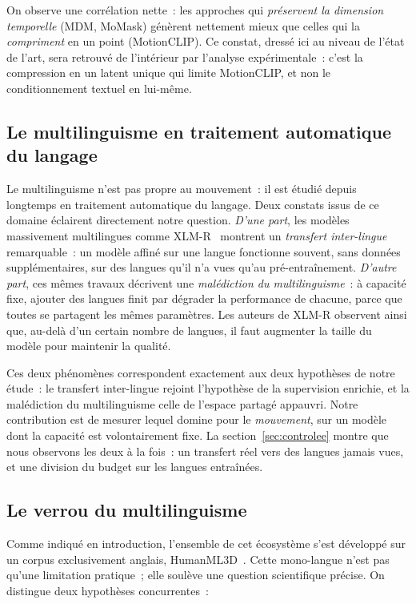 \documentclass[12pt,a4paper,oneside]{report}
\theoremstyle{definition}
\theoremstyle{plain}
\begin{document}
On observe une corrélation nette~: les approches qui \emph{préservent la dimension
temporelle} (MDM, MoMask) génèrent nettement mieux que celles qui la
\emph{compriment} en un point (MotionCLIP). Ce constat, dressé ici au niveau de
l'état de l'art, sera retrouvé de l'intérieur par l'analyse expérimentale~: c'est la
compression en un latent unique qui limite MotionCLIP, et non le conditionnement
textuel en lui-même.

\subsection{Le multilinguisme en traitement automatique du langage}
\label{sub:nlp-multi}

Le multilinguisme n'est pas propre au mouvement~: il est étudié depuis longtemps en
traitement automatique du langage. Deux constats issus de ce domaine éclairent
directement notre question. \emph{D'une part}, les modèles massivement multilingues
comme XLM-R~\cite{conneau2020xlmr} montrent un \emph{transfert inter-lingue}
remarquable~: un modèle affiné sur une langue fonctionne souvent, sans données
supplémentaires, sur des langues qu'il n'a vues qu'au pré-entraînement. \emph{D'autre
part}, ces mêmes travaux décrivent une \emph{malédiction du multilinguisme}~: à
capacité fixe, ajouter des langues finit par dégrader la performance de chacune,
parce que toutes se partagent les mêmes paramètres. Les auteurs de XLM-R observent
ainsi que, au-delà d'un certain nombre de langues, il faut augmenter la taille du
modèle pour maintenir la qualité.

Ces deux phénomènes correspondent exactement aux deux hypothèses de notre étude~:
le transfert inter-lingue rejoint l'hypothèse de la supervision enrichie, et la
malédiction du multilinguisme celle de l'espace partagé appauvri. Notre
contribution est de mesurer lequel domine pour le \emph{mouvement}, sur un modèle
dont la capacité est volontairement fixe. La section~\ref{sec:controlee} montre que
nous observons les deux à la fois~: un transfert réel vers des langues jamais vues,
et une division du budget sur les langues entraînées.

\subsection{Le verrou du multilinguisme}

Comme indiqué en introduction, l'ensemble de cet écosystème s'est développé sur
un corpus exclusivement anglais, HumanML3D~\cite{guo2022humanml3d}. Cette
mono-langue n'est pas qu'une limitation pratique~; elle soulève une question
scientifique précise. On distingue deux hypothèses concurrentes~:
\end{document}
